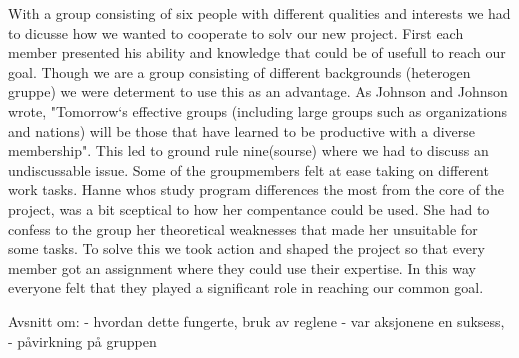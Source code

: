 With a group consisting of six people with different qualities and interests we had to dicusse how we wanted to cooperate to solv our new project. First each member presented his ability and knowledge that could be of usefull to reach our goal. Though we are a group consisting of different backgrounds (heterogen gruppe) we were determent to use this as an advantage. As Johnson and Johnson wrote, "Tomorrow`s effective groups (including large groups such as organizations and nations) will be those that have learned to be productive with a diverse membership". This led to ground rule nine(sourse) where we had to discuss an undiscussable issue. Some of the groupmembers felt at ease taking on different work tasks. Hanne whos study program differences the most from the core of the project, was a bit sceptical to how her compentance could be used. She had to confess to the group her theoretical weaknesses that made her unsuitable for some tasks. To solve this we took action and shaped the project so that every member got an assignment where they could use their expertise. In this way everyone felt 
that they played a significant role in reaching our common goal. 

Avsnitt om:
- hvordan dette fungerte, bruk av reglene
- var aksjonene en suksess, 
- påvirkning på gruppen

 

  